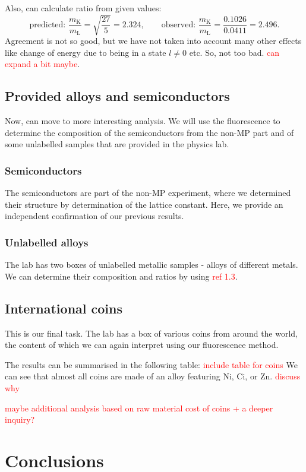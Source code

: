 \documentclass[11pt,a4paper,twoside,onecolumn]{article}
\newcommand{\reminder}[1]{\textcolor{red}{#1}}
\begin{document}
Also, can calculate ratio from given values:
\begin{equation}
    \text{predicted: }\frac{m_\mathrm{K}}{m_\mathrm{L}} = \sqrt{\frac{27}{5}} = 2.324,\qquad \text{observed: } \frac{m_\mathrm{K}}{m_\mathrm{L}} = \frac{0.1026}{0.0411} = 2.496.
\end{equation}
Agreement is not so good, but we have not taken into account many other effects like change of energy due to being in a state $l \neq 0$ etc. So, not too bad. \reminder{can expand a bit maybe}.

\subsection{Provided alloys and semiconductors}
Now, can move to more interesting analysis. We will use the fluorescence to determine the composition of the semiconductors from the non-MP part and of some unlabelled samples that are provided in the physics lab.

\subsubsection{Semiconductors}
The semiconductors are part of the non-MP experiment, where we determined their structure by determination of the lattice constant. Here, we provide an independent confirmation of our previous results. 

\subsubsection{Unlabelled alloys}
The lab has two boxes of unlabelled metallic samples - alloys of different metals. We can determine their composition and ratios by using \reminder{ref 1.3}.

\subsection{International coins}
This is our final task. The lab has a box of various coins from around the world, the content of which we can again interpret using our fluorescence method.

The results can be summarised in the following table:
\reminder{include table for coins}
We can see that almost all coins are made of an alloy featuring Ni, Ci, or Zn. \reminder{discuss why}

\reminder{maybe additional analysis based on raw material cost of coins + a deeper inquiry?}

\section{Conclusions}
\lipsum[1-5]
\end{document}
